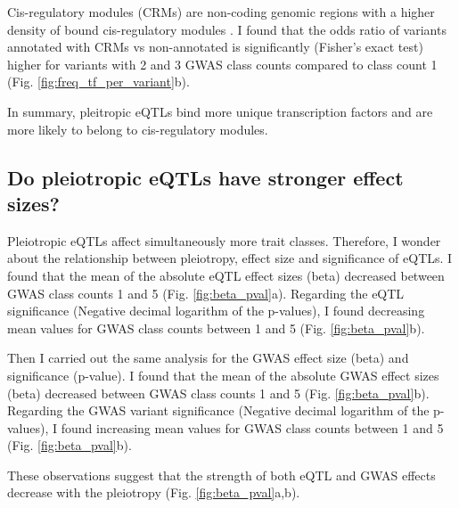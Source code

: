 Cis-regulatory modules (CRMs) are non-coding genomic regions with a higher density of bound cis-regulatory modules \citep{2021.Ballester.Hammal}.
%
I found that the odds ratio of variants annotated with CRMs vs non-annotated is significantly (Fisher's exact test) higher for variants with 2 and 3 GWAS class counts compared to class count 1 (Fig. \ref{fig:freq_tf_per_variant}b).

In summary, pleitropic eQTLs bind more unique transcription factors and are more
likely to belong to cis-regulatory modules.

\subsection*{Do pleiotropic eQTLs have stronger effect sizes?}

Pleiotropic eQTLs affect simultaneously more trait classes.
%
Therefore, I wonder about the relationship between pleiotropy, effect size and significance of eQTLs.
%
I found that the mean of the absolute eQTL effect sizes (beta) decreased between GWAS class counts 1 and 5 (Fig. \ref{fig:beta_pval}a).
%
Regarding the eQTL significance (Negative decimal logarithm of the p-values), I found decreasing mean values for GWAS class counts between 1 and 5 (Fig. \ref{fig:beta_pval}b).

Then I carried out the same analysis for the GWAS effect size (beta) and significance (p-value).
%
I found that the mean of the absolute GWAS effect sizes (beta) decreased between GWAS class counts 1 and 5 (Fig. \ref{fig:beta_pval}b).
%
Regarding the GWAS variant significance (Negative decimal logarithm of the p-values), I found increasing mean values for GWAS class counts between 1 and 5 (Fig. \ref{fig:beta_pval}b).

These observations suggest that the strength of both eQTL and GWAS effects decrease with the pleiotropy (Fig. \ref{fig:beta_pval}a,b).
